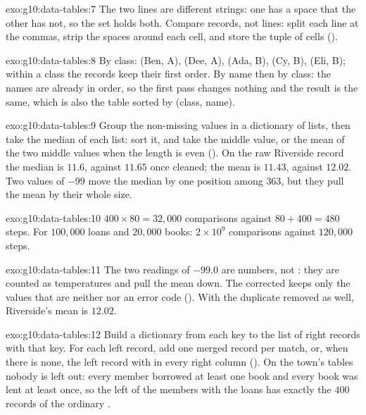 \begin{solution}{exo:g10:data-tables:7}
The two lines are different strings: one has a space that the other has not, so the set holds both. Compare records,
not lines: split each line at the commas, strip the spaces around each cell, and store the tuple of cells
().
\end{solution}

\begin{solution}{exo:g10:data-tables:8}
By class: (Ben, A), (Dee, A), (Ada, B), (Cy, B), (Eli, B); within a class the records keep their first order. By name
then by class: the names are already in order, so the first pass changes nothing and the result is the same, which
is also the table sorted by (class, name).
\end{solution}

\begin{solution}{exo:g10:data-tables:9}
Group the non-missing values in a dictionary of lists, then take the median of each list: sort it, and take the
middle value, or the mean of the two middle values when the length is even (). On the
raw Riverside record the median is $11.6$, against $11.65$ once cleaned; the mean is $11.43$, against $12.02$. Two
values of $-99$ move the median by one position among $363$, but they pull the mean by their whole size.
\end{solution}

\begin{solution}{exo:g10:data-tables:10}
$400 \times 80 = 32{,}000$ comparisons against $80 + 400 = 480$ steps. For $100{,}000$ loans and $20{,}000$ books:
$2 \times 10^9$ comparisons against $120{,}000$ steps.
\end{solution}

\begin{solution}{exo:g10:data-tables:11}
The two readings of $-99.0$ are numbers, not : they are counted as temperatures and pull the mean down. The
corrected  keeps only the values that are neither  nor an error
code (). With the duplicate removed as well, Riverside's mean is $12.02$.
\end{solution}

\begin{solution}{exo:g10:data-tables:12}
Build a dictionary from each key to the list of right records with that key. For each left record, add one merged
record per match, or, when there is none, the left record with  in every right column
(). On the town's tables nobody is left out: every member borrowed at least one book
and every book was lent at least once, so the left  of the members with the loans has exactly the $400$ records of
the ordinary .
\end{solution}

